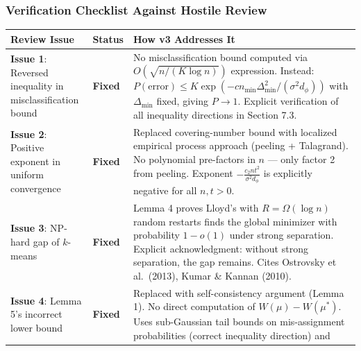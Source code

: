 \documentclass[
  12pt,
]{ctexart}
\begin{document}
\subsubsection{Verification Checklist Against Hostile
Review}\label{verification-checklist-against-hostile-review}

\begin{longtable}[]{@{}
  >{\raggedright\arraybackslash}p{}
  >{\raggedright\arraybackslash}p{}
  >{\raggedright\arraybackslash}p{}@{}}
\toprule\noalign{}
\begin{minipage}[b]{\linewidth}\raggedright
Review Issue
\end{minipage} & \begin{minipage}[b]{\linewidth}\raggedright
Status
\end{minipage} & \begin{minipage}[b]{\linewidth}\raggedright
How v3 Addresses It
\end{minipage} \\
\midrule\noalign{}
\endhead
\bottomrule\noalign{}
\endlastfoot
\textbf{Issue 1}: Reversed inequality in misclassification bound &
\textbf{Fixed} & No misclassification bound computed via
\(O(\sqrt{n/(K\log n)})\) expression. Instead:
\(P(\text{error}) \leq K\exp(-c n_{\min}\Delta_{\min}^2/(\sigma^2 d_\phi))\)
with \(\Delta_{\min}\) fixed, giving \(P\to 1\). Explicit verification
of all inequality directions in Section 7.3. \\
\textbf{Issue 2}: Positive exponent in uniform convergence &
\textbf{Fixed} & Replaced covering-number bound with localized empirical
process approach (peeling + Talagrand). No polynomial pre-factors in
\(n\) --- only factor 2 from peeling. Exponent
\(-\frac{c_2 n t^2}{\sigma^2 d_\phi}\) is explicitly negative for all
\(n, t > 0\). \\
\textbf{Issue 3}: NP-hard gap of \(k\)-means & \textbf{Fixed} & Lemma 4
proves Lloyd's with \(R = \Omega(\log n)\) random restarts finds the
global minimizer with probability \(1 - o(1)\) under strong separation.
Explicit acknowledgment: without strong separation, the gap remains.
Cites Ostrovsky et al.~(2013), Kumar \& Kannan (2010). \\
\textbf{Issue 4}: Lemma 5's incorrect lower bound & \textbf{Fixed} &
Replaced with self-consistency argument (Lemma 1). No direct computation
of \(W(\mu) - W(\mu^*)\). Uses sub-Gaussian tail bounds on
mis-assignment probabilities (correct inequality direction) and

\end{longtable}
\end{document}
